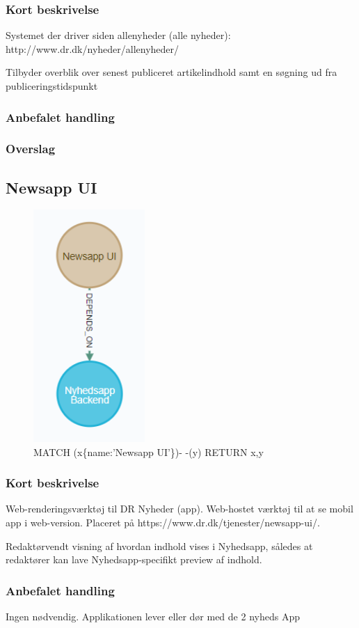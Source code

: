 \documentclass{article}
\begin{document}
\subsubsection{Kort beskrivelse}
Systemet der driver siden allenyheder (alle nyheder): http://www.dr.dk/nyheder/allenyheder/	

Tilbyder overblik over senest publiceret artikelindhold samt en søgning ud fra publiceringstidspunkt
\subsubsection{Anbefalet handling}
\subsubsection{Overslag}


\subsection{Newsapp UI}
\begin{figure}[h]
\includegraphics[width=120pt]{NyhedsAppUi.PNG}
\caption{MATCH (x\{name:'Newsapp UI'\})- -(y) RETURN x,y}
\end{figure}
\subsubsection{Kort beskrivelse}
Web-renderingsværktøj til DR Nyheder (app). Web-hostet værktøj til at se mobil app i web-version. Placeret på https://www.dr.dk/tjenester/newsapp-ui/.	

Redaktørvendt visning af hvordan indhold vises i Nyhedsapp, således at redaktører kan lave Nyhedsapp-specifikt preview af indhold.
\subsubsection{Anbefalet handling}
Ingen nødvendig. Applikationen lever eller dør med de 2 nyheds App
\end{document}
